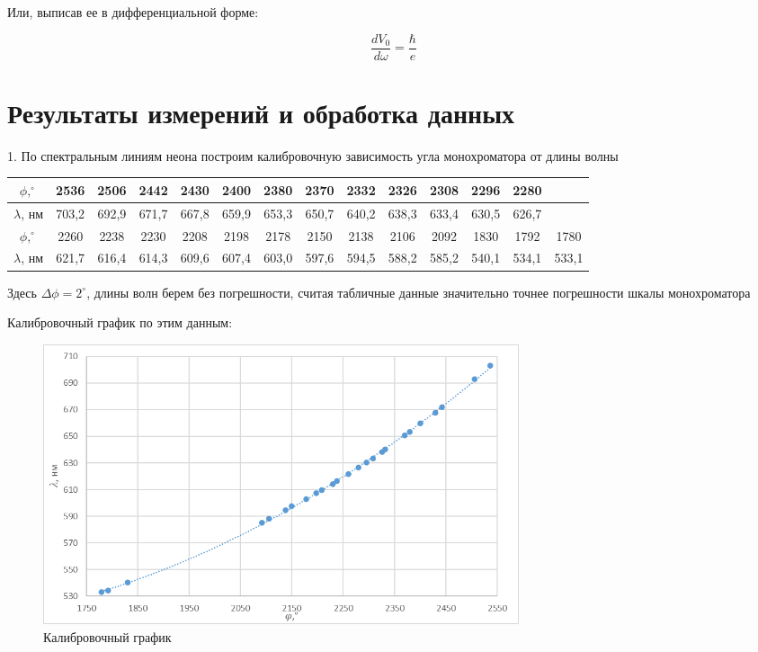 \documentclass[12pt,a4paper]{article}
\begin{document}
	Или, выписав ее в дифференциальной форме:
	
	\begin{equation}\label{dV/dw}
	\dfrac{dV_0}{d\omega} = \dfrac{\hbar}{e}
	\end{equation}


\section{Результаты измерений и обработка данных}

1. По спектральным линиям неона построим калибровочную зависимость угла монохроматора от длины волны

\begin{center}
\begin{tabular}{|c|c|c|c|c|c|c|c|c|c|c|c|c|c|}
\hline 
$\phi, ^\circ$ & 2536 & 2506 & 2442 & 2430 & 2400 & 2380 & 2370 & 2332 & 2326 & 2308 & 2296 & 2280  \\ 
\hline 
$\lambda$, нм & 703,2 & 692,9 & 671,7 & 667,8 & 659,9 & 653,3 & 650,7 & 640,2 & 638,3 & 633,4 & 630,5 & 626,7 \\ 
\hline 
$\phi, ^\circ$ & 2260 & 2238 & 2230 & 2208 & 2198 & 2178 & 2150 & 2138 & 2106 & 2092 & 1830 & 1792 & 1780 \\ 
\hline
$\lambda$, нм & 621,7 & 616,4 & 614,3 & 609,6 & 607,4 & 603,0 & 597,6 & 594,5 & 588,2 & 585,2 & 540,1 & 534,1 & 533,1  \\
\hline
\end{tabular} 
\end{center}

Здесь $\Delta \phi = 2 ^\circ$, длины волн берем без погрешности, считая табличные данные значительно точнее погрешности шкалы монохроматора

Калибровочный график по этим данным:

\begin{figure}[H]
	\begin{center}
		\includegraphics[width=14cm]{5.1.1-3}
		\caption{Калибровочный график}
	\end{center}
\end{figure}
\end{document}
